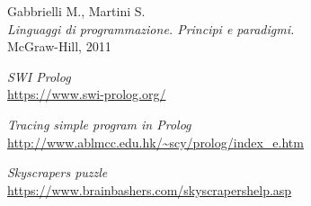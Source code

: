 \begin{thebibliography}{100}

	Gabbrielli M., Martini S.\\
	\emph{Linguaggi di programmazione. Principi e paradigmi.}\\
	McGraw-Hill, 2011

	\textit{SWI Prolog}\\
	\url{https://www.swi-prolog.org/}

	\textit{Tracing simple program in Prolog}\\
	\url{http://www.ablmcc.edu.hk/~scy/prolog/index_e.htm}

	\emph{Skyscrapers puzzle}\\
	\url{https://www.brainbashers.com/skyscrapershelp.asp}

\end{thebibliography}
